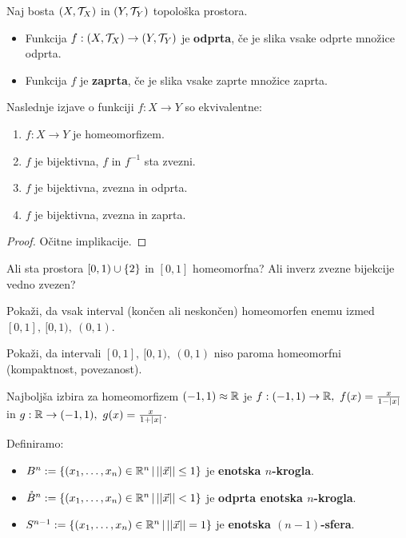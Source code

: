 \begin{definicija}
    Naj bosta $(X, \mathcal{T}_X)$ in $(Y, \mathcal{T}_Y)$ topološka prostora.
    \begin{itemize}
        \item Funkcija $f: (X, \mathcal{T}_X) \to (Y, \mathcal{T}_Y)$ je \textbf{odprta}, če je slika vsake odprte množice odprta.
        \item Funkcija $f$ je \textbf{zaprta}, če je slika vsake zaprte množice zaprta.
    \end{itemize}     
\end{definicija}

\begin{trditev}
    Naslednje izjave o funkciji $f: X \to Y$ so ekvivalentne:
    \begin{enumerate}
        \item $f: X \to Y$ je homeomorfizem.
        \item $f$ je bijektivna, $f$ in $f^{-1}$ sta zvezni.
        \item $f$ je bijektivna, zvezna in odprta.
        \item $f$ je bijektivna, zvezna in zaprta.
    \end{enumerate}
\end{trditev}

\begin{proof}
    Očitne implikacije.
\end{proof}

\begin{primer} 
    Ali sta prostora $[0, 1) \cup \{2\}$ in $[0,1]$ homeomorfna? Ali inverz zvezne bijekcije vedno zvezen?
\end{primer}

\begin{primer}
    Pokaži, da vsak interval (končen ali neskončen) homeomorfen enemu izmed $[0,1], \ [0, 1), \ (0,1)$.

    Pokaži, da intervali $[0,1], \ [0, 1), \ (0,1)$ niso paroma homeomorfni  (kompaktnost, povezanost).
\end{primer}

\begin{primer}
    Najboljša izbira za homeomorfizem $(-1, 1) \approx \mathbb{R}$ je $f: (-1, 1) \to \R, \ f(x) = \frac{x}{1 - |x|}$ in $g: \mathbb{R} \to (-1, 1), \ g(x) = \frac{x}{1+|x|}$.
\end{primer}

\begin{definicija} Definiramo:
    \begin{itemize}
        \item $B^n := \{(x_1, \ldots, x_n) \in \mathbb{R}^n \,|\, ||\vec{x}|| \leq 1\}$ je \textbf{enotska $n$-krogla}.
        \item $\mathring{B}^n := \{(x_1, \ldots, x_n) \in \mathbb{R}^n \,|\, ||\vec{x}|| < 1\}$ je \textbf{odprta enotska $n$-krogla}.
        \item $S^{n-1} := \{(x_1, \ldots, x_n) \in \mathbb{R}^n \,|\, ||\vec{x}|| = 1\}$ je \textbf{enotska $(n-1)$-sfera}.
    \end{itemize}
\end{definicija}

